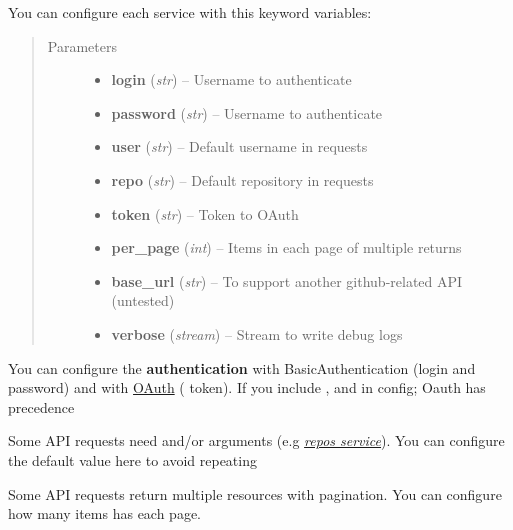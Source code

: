 \documentclass[letterpaper,10pt,english]{sphinxmanual}
\begin{document}
\begin{fulllineitems}
\label{services:pygithub3.services.base.Service}
You can configure each service with this keyword variables:
\begin{quote}\begin{description}
\item[{Parameters}] \leavevmode\begin{itemize}
\item {} 
\textbf{login} (\emph{str}) -- Username to authenticate

\item {} 
\textbf{password} (\emph{str}) -- Username to authenticate

\item {} 
\textbf{user} (\emph{str}) -- Default username in requests

\item {} 
\textbf{repo} (\emph{str}) -- Default repository in requests

\item {} 
\textbf{token} (\emph{str}) -- Token to OAuth

\item {} 
\textbf{per\_page} (\emph{int}) -- Items in each page of multiple returns

\item {} 
\textbf{base\_url} (\emph{str}) -- To support another github-related API (untested)

\item {} 
\textbf{verbose} (\emph{stream}) -- Stream to write debug logs

\end{itemize}

\end{description}\end{quote}

You can configure the \textbf{authentication} with BasicAuthentication (login
and password) and with \href{http://developer.github.com/v3/oauth/}{OAuth} (
token).
If you include ,  and  in config; Oauth has
precedence

Some API requests need  and/or  arguments (e.g
{\hyperref[repos:config-precedence]{\emph{repos service}}}).
You can configure the default value here to avoid repeating

Some API requests return multiple resources with pagination. You can
configure how many items has each page.


\end{fulllineitems}
\end{document}
